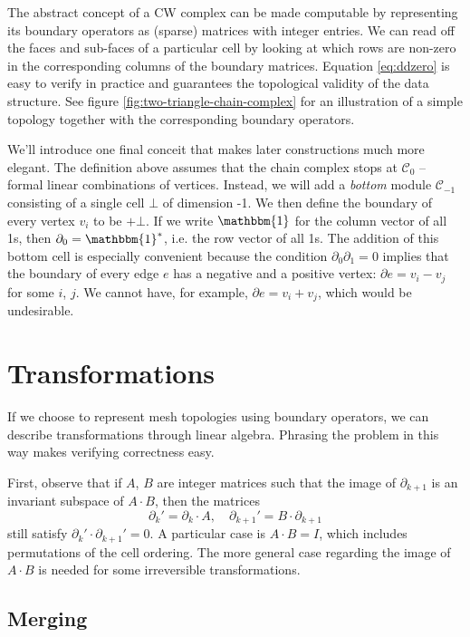 \documentclass[twocolumn]{article}
\begin{document}
The abstract concept of a CW complex can be made computable by representing its boundary operators as (sparse) matrices with integer entries.
We can read off the faces and sub-faces of a particular cell by looking at which rows are non-zero in the corresponding columns of the boundary matrices.
Equation \eqref{eq:ddzero} is easy to verify in practice and guarantees the topological validity of the data structure.
See figure \ref{fig:two-triangle-chain-complex} for an illustration of a simple topology together with the corresponding boundary operators.

We'll introduce one final conceit that makes later constructions much more elegant.
The definition above assumes that the chain complex stops at $\mathscr{C}_0$ -- formal linear combinations of vertices.
Instead, we will add a \emph{bottom} module $\mathscr{C}_{-1}$ consisting of a single cell $\bot$ of dimension -1.
We then define the boundary of every vertex $v_i$ to be $+\bot$.
If we write $\mathbbm{1}$ for the column vector of all 1s, then $\partial_0 = \mathbbm{1}^*$, i.e. the row vector of all 1s.
The addition of this bottom cell is especially convenient because the condition $\partial_0\partial_1 = 0$ implies that the boundary of every edge $e$ has a negative and a positive vertex: $\partial e = v_i - v_j$ for some $i$, $j$.
We cannot have, for example, $\partial e = v_i + v_j$, which would be undesirable.


\section{Transformations}

If we choose to represent mesh topologies using boundary operators, we can describe transformations through linear algebra.
Phrasing the problem in this way makes verifying correctness easy.

First, observe that if $A$, $B$ are integer matrices such that the image of $\partial_{k + 1}$ is an invariant subspace of $A\cdot B$, then the matrices
\begin{equation}
    \partial_k' = \partial_k\cdot A, \quad \partial_{k + 1}' = B\cdot\partial_{k + 1}
\end{equation}
still satisfy $\partial_k'\cdot\partial_{k + 1}' = 0$.
A particular case is $A\cdot B = I$, which includes permutations of the cell ordering.
The more general case regarding the image of $A\cdot B$ is needed for some irreversible transformations.

\subsection{Merging}
\end{document}
